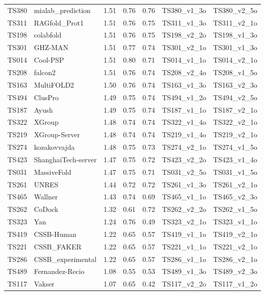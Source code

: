 \begin{table}[ht]
{\begin{tabular}{llrrrll}
TS380 & mialab\_prediction & 1.51 & 0.76 & 0.76 & TS380\_v1\_3o & TS380\_v2\_5o \\ 
TS311 & RAGfold\_Prot1 & 1.51 & 0.76 & 0.75 & TS311\_v1\_3o & TS311\_v2\_1o \\ 
TS198 & colabfold & 1.51 & 0.76 & 0.75 & TS198\_v2\_2o & TS198\_v1\_3o \\ 
TS301 & GHZ-MAN & 1.51 & 0.77 & 0.74 & TS301\_v2\_1o & TS301\_v1\_3o \\ 
TS014 & Cool-PSP & 1.51 & 0.80 & 0.71 & TS014\_v1\_1o & TS014\_v2\_1o \\ 
TS208 & falcon2 & 1.51 & 0.76 & 0.74 & TS208\_v2\_4o & TS208\_v1\_5o \\ 
TS163 & MultiFOLD2 & 1.50 & 0.76 & 0.74 & TS163\_v1\_3o & TS163\_v2\_3o \\ 
TS494 & ClusPro & 1.49 & 0.75 & 0.74 & TS494\_v1\_2o & TS494\_v2\_5o \\ 
TS187 & Ayush & 1.49 & 0.75 & 0.74 & TS187\_v1\_1o & TS187\_v2\_1o \\ 
TS322 & XGroup & 1.48 & 0.74 & 0.74 & TS322\_v1\_4o & TS322\_v2\_1o \\ 
TS219 & XGroup-Server & 1.48 & 0.74 & 0.74 & TS219\_v1\_4o & TS219\_v2\_1o \\ 
TS274 & kozakovvajda & 1.48 & 0.75 & 0.73 & TS274\_v2\_1o & TS274\_v1\_5o \\ 
TS423 & ShanghaiTech-server & 1.47 & 0.75 & 0.72 & TS423\_v2\_2o & TS423\_v1\_4o \\ 
TS031 & MassiveFold & 1.47 & 0.75 & 0.71 & TS031\_v2\_5o & TS031\_v1\_5o \\ 
TS261 & UNRES & 1.44 & 0.72 & 0.72 & TS261\_v1\_3o & TS261\_v2\_1o \\ 
TS465 & Wallner & 1.43 & 0.74 & 0.69 & TS465\_v1\_1o & TS465\_v2\_3o \\ 
TS262 & CoDock & 1.32 & 0.61 & 0.72 & TS262\_v2\_2o & TS262\_v1\_5o \\ 
TS323 & Yan & 1.24 & 0.76 & 0.49 & TS323\_v2\_1o & TS323\_v1\_1o \\ 
TS419 & CSSB-Human & 1.22 & 0.65 & 0.57 & TS419\_v1\_1o & TS419\_v2\_1o \\ 
TS221 & CSSB\_FAKER & 1.22 & 0.65 & 0.57 & TS221\_v1\_1o & TS221\_v2\_1o \\ 
TS286 & CSSB\_experimental & 1.22 & 0.65 & 0.57 & TS286\_v1\_1o & TS286\_v2\_1o \\ 
TS489 & Fernandez-Recio & 1.08 & 0.55 & 0.53 & TS489\_v1\_3o & TS489\_v2\_3o \\ 
TS117 & Vakser & 1.07 & 0.65 & 0.42 & TS117\_v2\_2o & TS117\_v1\_2o \\ 

\end{tabular}}
\end{table}
